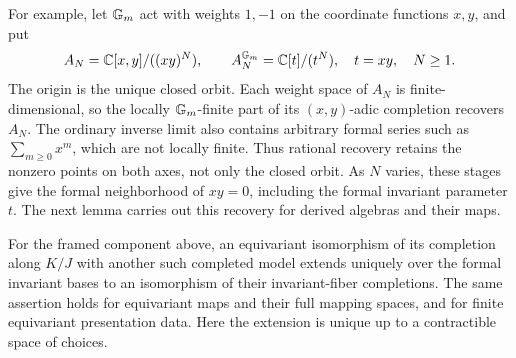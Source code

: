 For example, let $\mathbb G_m$ act with weights $1,-1$ on the coordinate
functions $x,y$, and put
\[
 A_N=\mathbb C[x,y]/((xy)^N),\qquad
 A_N^{\mathbb G_m}=\mathbb C[t]/(t^N),\quad t=xy,\quad N\ge1.
\]
The origin is the unique closed orbit. Each weight space of $A_N$ is
finite-dimensional, so the locally $\mathbb G_m$-finite part of its
$(x,y)$-adic completion recovers $A_N$. The ordinary inverse limit
also contains arbitrary formal series such as $\sum_{m\ge0}x^m$,
which are not locally finite. Thus rational recovery retains the
nonzero points on both axes, not only the closed orbit. As $N$
varies, these stages give the formal neighborhood of $xy=0$,
including the formal invariant parameter $t$. The next lemma carries
out this recovery for derived algebras and their maps.

\begin{lemma}
\label{mod:reconstruction}
For the framed component above, an equivariant isomorphism of its
completion along $K/J$ with another such completed model extends
uniquely over the formal invariant bases to an isomorphism of their
invariant-fiber completions. The same assertion holds for equivariant
maps and their full mapping spaces, and for finite equivariant
presentation data. Here the extension is unique up to a contractible
space of choices.
\end{lemma}

